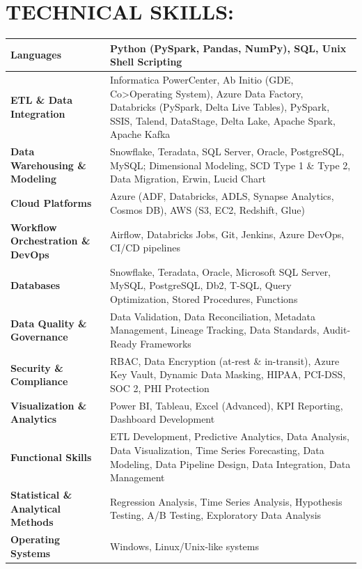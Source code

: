 \documentclass[a4paper,10pt]{article}
\begin{document}
\section*{TECHNICAL SKILLS:}
\renewcommand{\arraystretch}{1.15}
\begin{longtable}{|p{}|p{}|}
\hline
\textbf{Languages} & Python (PySpark, Pandas, NumPy), SQL, Unix Shell Scripting \\
\hline
\textbf{ETL \& Data Integration} & Informatica PowerCenter, Ab Initio (GDE, Co>Operating System), Azure Data Factory, Databricks (PySpark, Delta Live Tables), PySpark, SSIS, Talend, DataStage, Delta Lake, Apache Spark, Apache Kafka \\
\hline
\textbf{Data Warehousing \& Modeling} & Snowflake, Teradata, SQL Server, Oracle, PostgreSQL, MySQL; Dimensional Modeling, SCD Type 1 \& Type 2, Data Migration, Erwin, Lucid Chart \\
\hline
\textbf{Cloud Platforms} & Azure (ADF, Databricks, ADLS, Synapse Analytics, Cosmos DB), AWS (S3, EC2, Redshift, Glue) \\
\hline
\textbf{Workflow Orchestration \& DevOps} & Airflow, Databricks Jobs, Git, Jenkins, Azure DevOps, CI/CD pipelines \\
\hline
\textbf{Databases} & Snowflake, Teradata, Oracle, Microsoft SQL Server, MySQL, PostgreSQL, Db2, T-SQL, Query Optimization, Stored Procedures, Functions \\
\hline
\textbf{Data Quality \& Governance} & Data Validation, Data Reconciliation, Metadata Management, Lineage Tracking, Data Standards, Audit-Ready Frameworks \\
\hline
\textbf{Security \& Compliance} & RBAC, Data Encryption (at-rest \& in-transit), Azure Key Vault, Dynamic Data Masking, HIPAA, PCI-DSS, SOC 2, PHI Protection \\
\hline
\textbf{Visualization \& Analytics} & Power BI, Tableau, Excel (Advanced), KPI Reporting, Dashboard Development \\
\hline
\textbf{Functional Skills} & ETL Development, Predictive Analytics, Data Analysis, Data Visualization, Time Series Forecasting, Data Modeling, Data Pipeline Design, Data Integration, Data Management \\
\hline
\textbf{Statistical \& Analytical Methods} & Regression Analysis, Time Series Analysis, Hypothesis Testing, A/B Testing, Exploratory Data Analysis \\
\hline
\textbf{Operating Systems} & Windows, Linux/Unix-like systems \\
\hline
\end{longtable}
\end{document}

